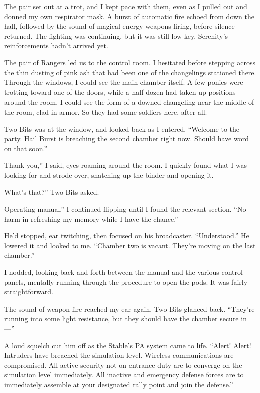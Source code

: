 The pair set out at a trot, and I kept pace with them, even as I pulled out and donned my own respirator mask. A burst of automatic fire echoed from down the hall, followed by the sound of magical energy weapons firing, before silence returned. The fighting was continuing, but it was still low-key. Serenity’s reinforcements hadn’t arrived yet.

The pair of Rangers led us to the control room. I hesitated before stepping across the thin dusting of pink ash that had been one of the changelings stationed there. Through the windows, I could see the main chamber itself. A few ponies were trotting toward one of the doors, while a half-dozen had taken up positions around the room. I could see the form of a downed changeling near the middle of the room, clad in armor. So they had some soldiers here, after all.

Two Bits was at the window, and looked back as I entered. “Welcome to the party. Hail Burst is breaching the second chamber right now. Should have word on that soon.”

\leavevmode{}Thank you,” I said, eyes roaming around the room. I quickly found what I was looking for and strode over, snatching up the binder and opening it.

\leavevmode{}What’s that?” Two Bits asked.

\leavevmode{}Operating manual.” I continued flipping until I found the relevant section. “No harm in refreshing my memory while I have the chance.”

He’d stopped, ear twitching, then focused on his broadcaster. “Understood.” He lowered it and looked to me. “Chamber two is vacant. They’re moving on the last chamber.”

I nodded, looking back and forth between the manual and the various control panels, mentally running through the procedure to open the pods. It was fairly straightforward.

The sound of weapon fire reached my ear again. Two Bits glanced back. “They’re running into some light resistance, but they should have the chamber secure in—”

A loud squelch cut him off as the Stable’s PA system came to life. “Alert! Alert! Intruders have breached the simulation level. Wireless communications are compromised. All active security not on entrance duty are to converge on the simulation level immediately. All inactive and emergency defense forces are to immediately assemble at your designated rally point and join the defense.”

